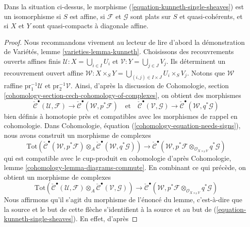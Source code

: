 \begin{lemma}
\label{lemma-kunneth-single-sheaf}
Dans la situation ci-dessus, le morphisme (\ref{equation-kunneth-single-sheaves}) est un
isomorphisme si $S$ est affine, si $\mathcal{F}$ et $\mathcal{G}$ sont plats sur $S$ et
quasi-cohérents, et si $X$ et $Y$ sont quasi-compacts à diagonale affine.
\end{lemma}

\begin{proof}
Nous recommandons vivement au lecteur de lire d'abord la démonstration de
Variétés, lemme \ref{varieties-lemma-kunneth}.
Choisissons des recouvrements ouverts affines finis
$\mathcal{U} : X = \bigcup_{i \in I} U_i$ et
$\mathcal{V} : Y = \bigcup_{j \in J} V_j$.
Ils déterminent un recouvrement ouvert affine
$\mathcal{W} : X \times_S Y = \bigcup_{(i, j) \in I \times J} U_i \times_S V_j$.
Notons que $\mathcal{W}$ raffine
$\text{pr}_1^{-1}\mathcal{U}$ et $\text{pr}_2^{-1}\mathcal{V}$.
Ainsi, d'après la discussion de Cohomologie, section
\ref{cohomology-section-cech-cohomology-of-complexes},
on obtient des morphismes
$$
\check{\mathcal{C}}^\bullet(\mathcal{U}, \mathcal{F})
\to
\check{\mathcal{C}}^\bullet(\mathcal{W}, p^*\mathcal{F})
\quad\text{et}\quad
\check{\mathcal{C}}^\bullet(\mathcal{V}, \mathcal{G})
\to
\check{\mathcal{C}}^\bullet(\mathcal{W}, q^*\mathcal{G})
$$
bien définis à homotopie près et compatibles avec les morphismes de rappel en cohomologie.
Dans Cohomologie, équation (\ref{cohomology-equation-needs-signs}),
nous avons construit un morphisme de complexes
$$
\text{Tot}(
\check{\mathcal{C}}^\bullet(\mathcal{W}, p^*\mathcal{F})
\otimes_A
\check{\mathcal{C}}^\bullet(\mathcal{W}, q^*\mathcal{G}))
\longrightarrow
\check{\mathcal{C}}^\bullet(\mathcal{W},
p^*\mathcal{F} \otimes_{\mathcal{O}_{X \times_S Y}}
q^*\mathcal{G})
$$
qui est compatible avec le cup-produit en cohomologie d'après
Cohomologie, lemme \ref{cohomology-lemma-diagrams-commute}.
En combinant ce qui précède, on obtient un morphisme de complexes
\begin{equation}
\label{equation-kunneth-on-cech}
\text{Tot}(
\check{\mathcal{C}}^\bullet(\mathcal{U}, \mathcal{F})
\otimes_A
\check{\mathcal{C}}^\bullet(\mathcal{V}, \mathcal{G}))
\to
\check{\mathcal{C}}^\bullet(\mathcal{W},
p^*\mathcal{F}
\otimes_{\mathcal{O}_{X \times_S Y}}
q^*\mathcal{G})
\end{equation}
Nous affirmons qu'il s'agit du morphisme de l'énoncé du lemme, c'est-à-dire que
la source et le but de cette flèche s'identifient à la source
et au but de (\ref{equation-kunneth-single-sheaves}). En effet, d'après

\end{proof}
